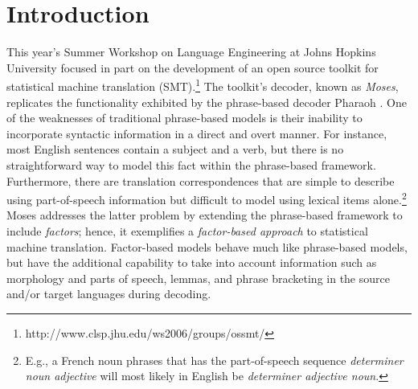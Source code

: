 \documentclass[11pt]{report}
\theoremstyle{plain}
\begin{document}
{\section{Introduction}
\label{intro}

This year's Summer Workshop on Language Engineering at Johns Hopkins
University focused in part on the development of an open source
toolkit for statistical machine translation
(SMT).\footnote{http://www.clsp.jhu.edu/ws2006/groups/ossmt/} The
toolkit's decoder, known as {\em Moses}, replicates the functionality
exhibited by the phrase-based decoder Pharaoh . One of
the weaknesses of traditional phrase-based models is their inability
to incorporate syntactic information in a direct and overt manner. For
instance, most English sentences contain a subject and a verb, but
there is no straightforward way to model this fact within the
phrase-based framework. Furthermore, there are translation
correspondences that are simple to describe using part-of-speech
information but difficult to model using lexical items
alone.\footnote{E.g., a French noun phrases that has the
part-of-speech sequence {\em determiner noun adjective} will most
likely in English be {\em determiner adjective noun}.} Moses addresses
the latter problem by extending the phrase-based framework to include
{\em factors}; hence, it exemplifies a {\em factor-based approach} to
statistical machine translation. Factor-based models behave much like
phrase-based models, but have the additional capability to take into
account information such as morphology and parts of speech, lemmas,
and phrase bracketing in the source and/or target languages during
decoding.

}
\end{document}
